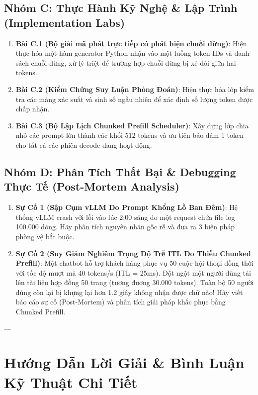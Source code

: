 \subsection{Nhóm C: Thực Hành Kỹ Nghệ \& Lập Trình (Implementation Labs)}
\begin{enumerate}
  \item \textbf{Bài C.1 (Bộ giải mã phát trực tiếp có phát hiện chuỗi dừng)}:
  Hiện thực hóa một hàm generator Python  nhận vào một luồng token IDs và danh sách chuỗi dừng, xử lý triệt để trường hợp chuỗi dừng bị xẻ đôi giữa hai tokens.

  \item \textbf{Bài C.2 (Kiểm Chứng Suy Luận Phỏng Đoán)}:
  Hiện thực hóa lớp  kiểm tra các mảng xác suất và sinh số ngẫu nhiên để xác định số lượng token được chấp nhận.

  \item \textbf{Bài C.3 (Bộ Lập Lịch Chunked Prefill Scheduler)}:
  Xây dựng lớp  chia nhỏ các prompt lớn thành các khối $512$ tokens và ưu tiên bảo đảm 1 token cho tất cả các phiên decode đang hoạt động.
\end{enumerate}

\subsection{Nhóm D: Phân Tích Thất Bại \& Debugging Thực Tế (Post-Mortem Analysis)}
\begin{enumerate}
  \item \textbf{Sự Cố 1 (Sập Cụm vLLM Do Prompt Khổng Lồ Ban Đêm)}:
  Hệ thống vLLM crash với lỗi  vào lúc 2:00 sáng do một request chứa file log 100.000 dòng. Hãy phân tích nguyên nhân gốc rễ và đưa ra 3 biện pháp phòng vệ bắt buộc.

  \item \textbf{Sự Cố 2 (Suy Giảm Nghiêm Trọng Độ Trễ ITL Do Thiếu Chunked Prefill)}:
  Một chatbot hỗ trợ khách hàng phục vụ 50 cuộc hội thoại đồng thời với tốc độ mượt mà 40 tokens/s (ITL = 25ms). Đột ngột một người dùng tải lên tài liệu hợp đồng 50 trang (tương đương 30.000 tokens). Toàn bộ 50 người dùng còn lại bị khựng lại hơn 1.2 giây không nhận được chữ nào! Hãy viết báo cáo sự cố (Post-Mortem) và phân tích giải pháp khắc phục bằng Chunked Prefill.
\end{enumerate}

---

\section{Hướng Dẫn Lời Giải \& Bình Luận Kỹ Thuật Chi Tiết}
\label{sec:ch07-solutions}

